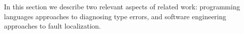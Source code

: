 \label{sec:nate:related-work}
\label{sec:nate:type-error-diagnosis}

In this section we describe two relevant aspects of related work:
%
programming languages approaches to diagnosing type errors, and
%
software engineering approaches to fault localization.
%
%
%

